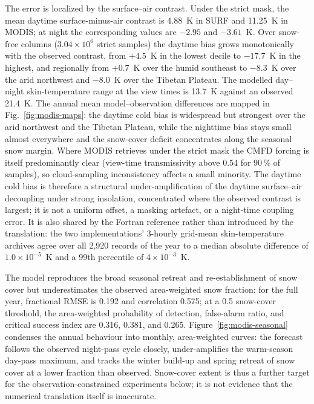The error is localized by the surface--air contrast. Under the strict mask,
the mean daytime surface-minus-air contrast is 4.88~K in SURF and 11.25~K in
MODIS; at night the corresponding values are $-2.95$ and $-3.61$~K. Over
snow-free columns ($3.04\times10^{6}$ strict samples) the daytime bias grows
monotonically with the observed contrast, from $+4.5$~K in the lowest decile
to $-17.7$~K in the highest, and regionally from $+0.7$~K over the humid
southeast to $-8.3$~K over the arid northwest and $-8.0$~K over the Tibetan
Plateau. The modelled day--night skin-temperature range at the view times
is 13.7~K against an observed 21.4~K. The annual mean model--observation
differences are mapped in Fig.~\ref{fig:modis-maps}: the daytime cold bias
is widespread but strongest over the arid northwest and the Tibetan Plateau,
while the nighttime bias stays small almost everywhere and the snow-cover
deficit concentrates along the seasonal snow margin. Where MODIS retrieves under the strict
mask the CMFD forcing is itself predominantly clear (view-time
transmissivity above 0.54 for 90\,\% of samples), so cloud-sampling
inconsistency affects a small minority. The daytime cold bias is therefore a
structural under-amplification of the daytime surface--air decoupling under
strong insolation, concentrated where the observed contrast is largest; it is
not a uniform offset, a masking artefact, or a night-time coupling error.
It is also shared by the Fortran reference rather than introduced by the
translation: the two implementations' 3-hourly grid-mean skin-temperature
archives agree over all 2{,}920 records of the year to a median absolute
difference of $1.0\times10^{-5}$~K and a 99th percentile of
$4\times10^{-3}$~K.

The model reproduces the broad seasonal retreat and re-establishment of snow
cover but underestimates the observed area-weighted snow fraction: for the
full year, fractional RMSE is 0.192 and correlation 0.575; at a 0.5
snow-cover threshold, the area-weighted probability of detection, false-alarm
ratio, and critical success index are 0.316, 0.381, and 0.265.
Figure~\ref{fig:modis-seasonal} condenses the annual behaviour into monthly,
area-weighted curves: the forecast follows the observed night-pass cycle
closely, under-amplifies the warm-season day-pass maximum, and tracks the
winter build-up and spring retreat of snow cover at a lower fraction than
observed. Snow-cover
extent is thus a further target for the observation-constrained experiments
below; it is not evidence that the numerical translation itself is
inaccurate.

